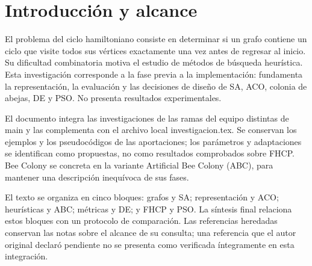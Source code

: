 \chapter{Introducción y alcance}
El problema del ciclo hamiltoniano consiste en determinar si un grafo contiene un ciclo que visite todos sus vértices exactamente una vez antes de regresar al inicio. Su dificultad combinatoria motiva el estudio de métodos de búsqueda heurística. Esta investigación corresponde a la fase previa a la implementación: fundamenta la representación, la evaluación y las decisiones de diseño de SA, ACO, colonia de abejas, DE y PSO. No presenta resultados experimentales.

El documento integra las investigaciones de las ramas del equipo distintas de main y las complementa con el archivo local investigacion.tex. Se conservan los ejemplos y los pseudocódigos de las aportaciones; los parámetros y adaptaciones se identifican como propuestas, no como resultados comprobados sobre FHCP. Bee Colony se concreta en la variante Artificial Bee Colony (ABC), para mantener una descripción inequívoca de sus fases.

El texto se organiza en cinco bloques: grafos y SA; representación y ACO; heurísticas y ABC; métricas y DE; y FHCP y PSO. La síntesis final relaciona estos bloques con un protocolo de comparación. Las referencias heredadas conservan las notas sobre el alcance de su consulta; una referencia que el autor original declaró pendiente no se presenta como verificada íntegramente en esta integración.
